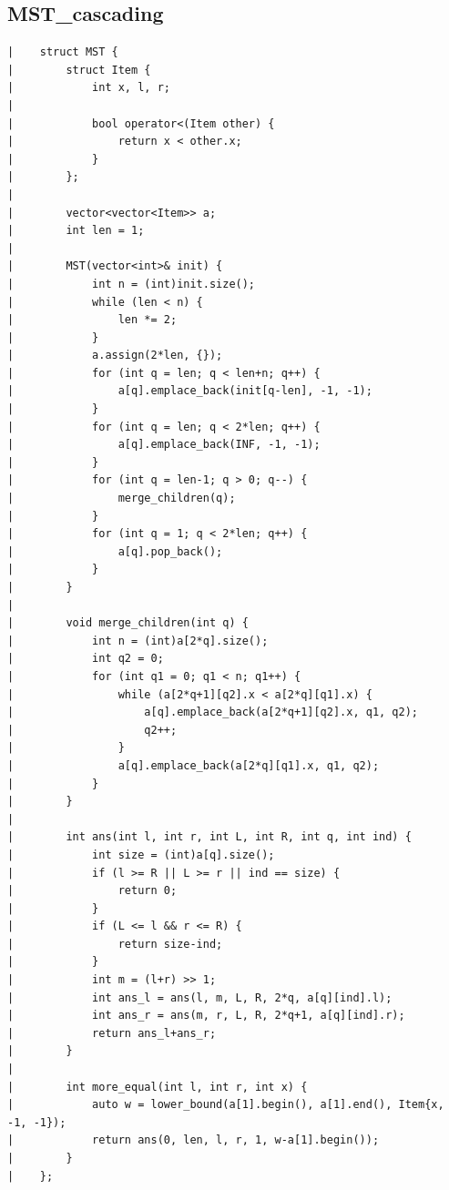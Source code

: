 \documentclass[a4paper, 10pt]{article}
\begin{document}
\begin{center}
\section*{MST\_cascading}
\begin{verbatim}
|    struct MST {
|        struct Item {
|            int x, l, r;
|    
|            bool operator<(Item other) {
|                return x < other.x;
|            }
|        };
|    
|        vector<vector<Item>> a;
|        int len = 1;
|    
|        MST(vector<int>& init) {
|            int n = (int)init.size();
|            while (len < n) {
|                len *= 2;
|            }
|            a.assign(2*len, {});
|            for (int q = len; q < len+n; q++) {
|                a[q].emplace_back(init[q-len], -1, -1);
|            }
|            for (int q = len; q < 2*len; q++) {
|                a[q].emplace_back(INF, -1, -1);
|            }
|            for (int q = len-1; q > 0; q--) {
|                merge_children(q);
|            }
|            for (int q = 1; q < 2*len; q++) {
|                a[q].pop_back();
|            }
|        }
|    
|        void merge_children(int q) {
|            int n = (int)a[2*q].size();
|            int q2 = 0;
|            for (int q1 = 0; q1 < n; q1++) {
|                while (a[2*q+1][q2].x < a[2*q][q1].x) {
|                    a[q].emplace_back(a[2*q+1][q2].x, q1, q2);
|                    q2++;
|                }
|                a[q].emplace_back(a[2*q][q1].x, q1, q2);
|            }
|        }
|    
|        int ans(int l, int r, int L, int R, int q, int ind) {
|            int size = (int)a[q].size();
|            if (l >= R || L >= r || ind == size) {
|                return 0;
|            }
|            if (L <= l && r <= R) {
|                return size-ind;
|            }
|            int m = (l+r) >> 1;
|            int ans_l = ans(l, m, L, R, 2*q, a[q][ind].l);
|            int ans_r = ans(m, r, L, R, 2*q+1, a[q][ind].r);
|            return ans_l+ans_r;
|        }
|    
|        int more_equal(int l, int r, int x) {
|            auto w = lower_bound(a[1].begin(), a[1].end(), Item{x, -1, -1});
|            return ans(0, len, l, r, 1, w-a[1].begin());
|        }
|    };
\end{verbatim}


\end{center}
\end{document}
